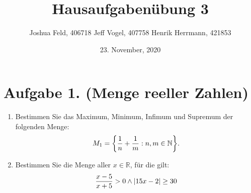 \documentclass[german,12pt]{homework}
\title{Hausaufgabenübung 3}
\author{Joshua Feld, 406718 \quad Jeff Vogel, 407758 \quad Henrik Herrmann, 421853}
\date{23. November, 2020}
\institute{RWTH Aachen University\\Center for Computational Engineering Science}
\newcommand{\NN}{\mathbb{N}}
\newcommand{\RR}{\mathbb{R}}
\DeclarePairedDelimiter{\absolute}{\lvert}{\rvert}
\DeclarePairedDelimiter{\penbrace}{\{}{\}}
\begin{document}
    \maketitle

    \section*{Aufgabe 1. (Menge reeller Zahlen)}

    \begin{problem}
        \begin{enumerate}
            \item Bestimmen Sie das Maximum, Minimum, Infimum und Supremum der folgenden Menge:
            \[M_1 = \penbrace*{\frac{1}{n} + \frac{1}{m} : n, m \in \NN}.\]
            \item Bestimmen Sie die Menge aller \(x \in \RR\), für die gilt:
            \[\frac{x - 5}{x + 5} > 0 \land \absolute*{15x - 2} \ge 30\]
        \end{enumerate}
    \end{problem}
\end{document}
